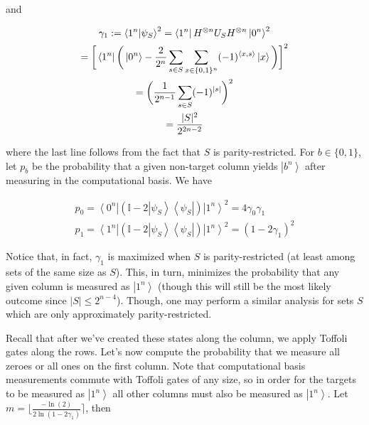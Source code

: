and\par


\[\begin{gathered}
\displaystyle\gamma_{1}:=\left\langle 1^{n}\middle|\psi_{S}\right\rangle^{2} \displaystyle=\left\langle 1^{n}\right|H^{\otimes n}U_{S}H^{\otimes n}\left|0^{n}\right\rangle^{2} \\
\displaystyle=\bigg{[}\left\langle 1^{n}\right|\bigg{(}\left|0^{n}\right\rangle-\frac{2}{2^{n}}\sum_{s\in S}\sum_{x\in\{0,1\}^{n}}(-1)^{\langle x,s\rangle}\left|x\right\rangle\bigg{)}\bigg{]}^{2} \\
\displaystyle=\bigg{(}\frac{1}{2^{n-1}}\sum_{s\in S}(-1)^{|s|}\bigg{)}^{2} \\
\displaystyle=\frac{|S|^{2}}{2^{2n-2}}
\end{gathered}\]


where the last line follows from the fact that $S$ is parity-restricted. For $b\in\{0,1\}$, let $p_{b}$ be the probability that a given non-target column yields $\left|b^{n}\right\rangle$ after measuring in the computational basis. We have\par


\[\begin{gathered}
\displaystyle p_{0} \displaystyle=\left\langle 0^{n}\right|(\mathbb{I}-2\left|\psi_{S}\right\rangle\!\left\langle\psi_{S}\right|)\left|1^{n}\right\rangle^{2}=4\gamma_{0}\gamma_{1} \\
\displaystyle p_{1} \displaystyle=\left\langle 1^{n}\right|(\mathbb{I}-2\left|\psi_{S}\right\rangle\!\left\langle\psi_{S}\right|)\left|1^{n}\right\rangle^{2}=(1-2\gamma_{1})^{2}
\end{gathered}\]


Notice that, in fact, $\gamma_{1}$ is maximized when $S$ is parity-restricted (at least among sets of the same size as $S$). This, in turn, minimizes the probability that any given column is measured as $\left|1^{n}\right\rangle$ (though this will still be the most likely outcome since $|S|\leq 2^{n-4}$). Though, one may perform a similar analysis for sets $S$ which are only approximately parity-restricted.\par




Recall that after we’ve created these states along the column, we apply Toffoli gates along the rows. Let’s now compute the probability that we measure all zeroes or all ones on the first column. Note that computational basis measurements commute with Toffoli gates of any size, so in order for the targets to be measured as $\left|1^{n}\right\rangle$ all other columns must also be measured as $\left|1^{n}\right\rangle$. Let $m=\lfloor\frac{-\ln(2)}{2\ln(1-2\gamma_{1})}\rceil$, then\par


